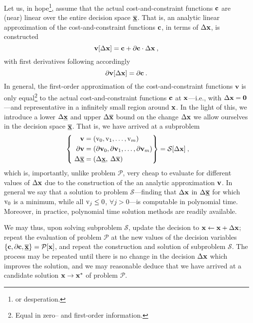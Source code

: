\documentclass[11pt]{article}
\begin{document}
Let us, in hope\footnote{or desperation.}, assume that the actual cost-and-constraint functions $\mathbf{c}$ are (near) linear over the entire decision space $\underline{\overline{\mathbf{x}}}$. That is, an analytic linear approximation of the cost-and-constraint functions $\mathbf{c}$, in terms of $\Delta \mathbf{x}$, is constructed
\begin{equation}
\textbf{v}[\Delta \mathbf{x}] = \mathbf{c} + \partial \mathbf{c} \cdot  \Delta \mathbf{x}   \:,
\end{equation}
with first derivatives following accordingly
\begin{equation}
\partial \textbf{v}[\Delta \mathbf{x}] = \partial \mathbf{c} \:.
\end{equation}
In general, the first-order approximation of the cost-and-constraint functions $\textbf{v}$ is only equal\footnote{Equal in zero-- and first-order information.} to the actual cost-and-constraint functions $\mathbf{c}$ at $\mathbf{x}$---i.e., with $\Delta \mathbf{x}=\textbf{0}$---and representative in a infinitely small region around $\mathbf{x}$. In the light of this, we introduce a lower $\Delta \underline{\mathbf{x}}$ and upper $\Delta \overline{\mathbf{x}}$ bound on the change $\Delta \mathbf{x}$ we allow ourselves in the decision space $\underline{\overline{\mathbf{x}}}$.
That is, we have arrived at a subproblem 
\begin{align}
\label{d:eqn:p}
 ~\left\{ ~
\begin{aligned}
\mathbf{v} &= (\textrm{v}_0, \textrm{v}_1, \ldots, \textrm{v}_m ) \\
\mathbf{\partial v} & = (\mathbf{\partial v}_0 , \mathbf{\partial v}_1 , \ldots,\mathbf{\partial v}_m  ) \\
\Delta \underline{\overline{\mathbf{x}}} & = ( \Delta \underline{\mathbf{x}} , \: \Delta \overline{\mathbf{x}} ) \:
\end{aligned}\right\} =
\mathcal{S} [\Delta \mathbf{x}] \: ,
\end{align}
which is, importantly, unlike problem $\mathcal{P}$, very cheap to evaluate for different values of $\Delta \mathbf{x}$ due to the construction of the an analytic approximation $\mathbf{v}$. In general we say that a solution to problem $\mathcal{S}$---finding that $\Delta \mathbf{x}$ in $\Delta \overline{\underline{\mathbf{x}}}$ for which $\textrm{v}_0$ is a minimum, while all $\textrm{v}_j \leq 0$, $\forall j > 0$---is computable in polynomial time. Moreover, in practice, polynomial time solution methods are readily available.

We may thus, upon solving subproblem $\mathcal{S}$, update the decision to $\mathbf{x} \gets \mathbf{x} + \Delta \mathbf{x}$; repeat the evaluation of problem $\mathcal{P}$ at the new values of the decision variables $\left\{\mathbf{c}, \partial \mathbf{c}, \underline{\overline{\mathbf{x}}}\right\}=\mathcal{P}[\mathbf{x}]$, and repeat the construction and solution of subproblem $\mathcal{S}$. The process may be repeated until there is no change in the decision $\Delta \mathbf{x}$ which improves the solution, and we may reasonable deduce that we have arrived at a candidate solution $\mathbf{x} \to \mathbf{x}^\ast$ of problem $\mathcal{P}$.
\end{document}
